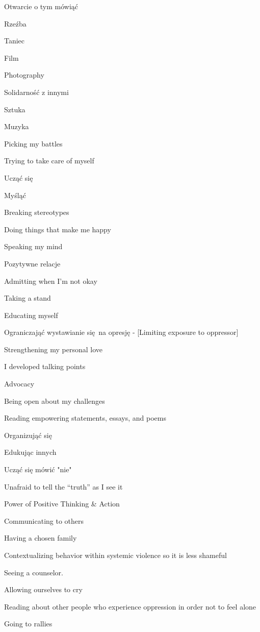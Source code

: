 \begin{multicols}{2}
\begin{checkboxlist}
\item Otwarcie o tym mówiąć
\item Rzeźba
\item Taniec
\item Film
\item Photography
\item Solidarność z innymi
\item Sztuka
\item Muzyka
\item Picking my battles
\item Trying to take care of myself
\item Ucząć się
\item Myśląć
\item Breaking stereotypes
\item Doing things that make me happy
\item Speaking my mind
\item Pozytywne relacje
\item Admitting when I’m not okay
\item Taking a stand
\item Educating myself
\item Ograniczająć wystawianie się na opresję - [Limiting exposure to oppressor]
\item Strengthening my personal love
\item I developed talking points
\item Advocacy
\item Being open about my challenges
\item Reading empowering statements, essays, and poems
\item Organizująć się
\item Edukując innych
\item Ucząć się mówić "nie"
\item Unafraid to tell the “truth” as I see it
\item Power of Positive Thinking \& Action
\item Communicating to others
\item Having a chosen family
\item Contextualizing behavior within systemic violence so it is less shameful
\item Seeing a counselor.
\item Allowing ourselves to cry
\item Reading about other people who experience oppression in order not to feel alone
\item Going to rallies

\end{checkboxlist}
\end{multicols}
